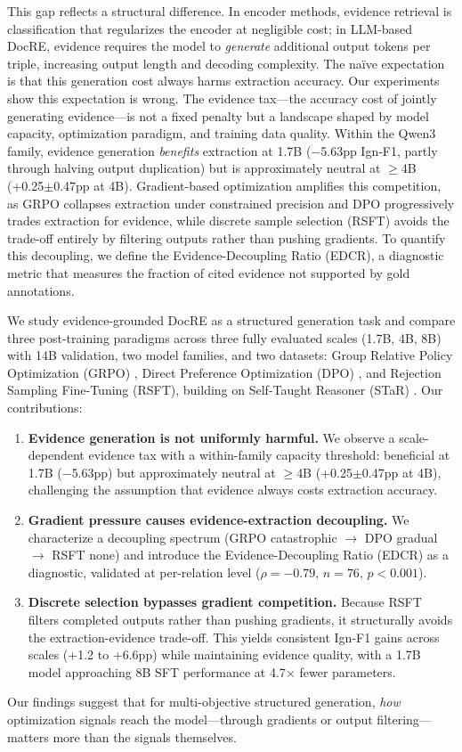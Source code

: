 This gap reflects a structural difference.
In encoder methods, evidence retrieval is classification that regularizes the encoder at negligible cost; in LLM-based DocRE, evidence requires the model to \emph{generate} additional output tokens per triple, increasing output length and decoding complexity.
The na\"{i}ve expectation is that this generation cost always harms extraction accuracy.
Our experiments show this expectation is wrong.
The evidence tax---the accuracy cost of jointly generating evidence---is not a fixed penalty but a landscape shaped by model capacity, optimization paradigm, and training data quality.
Within the Qwen3 family, evidence generation \emph{benefits} extraction at 1.7B ($-$5.63pp Ign-F1, partly through halving output duplication) but is approximately neutral at $\geq$4B (+0.25$\pm$0.47pp at 4B).
Gradient-based optimization amplifies this competition, as GRPO collapses extraction under constrained precision and DPO progressively trades extraction for evidence, while discrete sample selection (RSFT) avoids the trade-off entirely by filtering outputs rather than pushing gradients. To quantify this decoupling, we define the Evidence-Decoupling Ratio (EDCR), a diagnostic metric that measures the fraction of cited evidence not supported by gold annotations.

We study evidence-grounded DocRE as a structured generation task and compare three post-training paradigms across three fully evaluated scales (1.7B, 4B, 8B) with 14B validation, two model families, and two datasets: Group Relative Policy Optimization (GRPO) \citep{shao2024deepseekmath}, Direct Preference Optimization (DPO) \citep{rafailov2023direct}, and Rejection Sampling Fine-Tuning (RSFT), building on Self-Taught Reasoner (STaR) \citep{zelikman2022star}. Our contributions:
\begin{enumerate}[itemsep=1pt,parsep=0pt,topsep=2pt,partopsep=0pt,leftmargin=*]
    \item \textbf{Evidence generation is not uniformly harmful.} We observe a scale-dependent evidence tax with a within-family capacity threshold: beneficial at 1.7B ($-$5.63pp) but approximately neutral at $\geq$4B (+0.25$\pm$0.47pp at 4B), challenging the assumption that evidence always costs extraction accuracy.
    \item \textbf{Gradient pressure causes evidence-extraction decoupling.} We characterize a decoupling spectrum (GRPO catastrophic $\rightarrow$ DPO gradual $\rightarrow$ RSFT none) and introduce the Evidence-Decoupling Ratio (EDCR) as a diagnostic, validated at per-relation level ($\rho{=}{-}0.79$, $n{=}76$, $p{<}0.001$).
    \item \textbf{Discrete selection bypasses gradient competition.} Because RSFT filters completed outputs rather than pushing gradients, it structurally avoids the extraction-evidence trade-off. This yields consistent Ign-F1 gains across scales (+1.2 to +6.6pp) while maintaining evidence quality, with a 1.7B model approaching 8B SFT performance at 4.7$\times$ fewer parameters.
\end{enumerate}

\noindent Our findings suggest that for multi-objective structured generation, \emph{how} optimization signals reach the model---through gradients or output filtering---matters more than the signals themselves.
